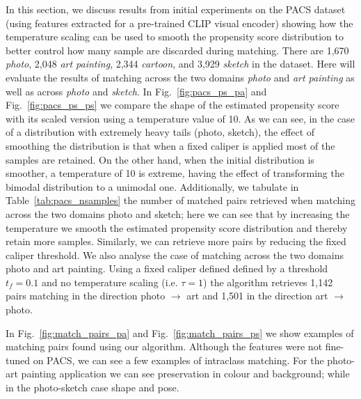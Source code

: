 In this section, we discuss results from initial experiments on the PACS
dataset~\citep{li2017deeper} (using features extracted for a pre-trained CLIP
\citep{radford2021learning} visual encoder) showing how the temperature scaling can be used to
smooth the propensity score distribution to better control how many sample are discarded during
matching. 
% 
There are 1,670 \emph{photo}, 2,048 \emph{art painting}, 2,344 \emph{cartoon}, and 3,929
\emph{sketch} in the dataset. Here will evaluate the results of matching across the two domains
\emph{photo} and \emph{art painting} as well as across \emph{photo} and \emph{sketch}.
% 
In Fig.~\ref{fig:pacs_ps_pa} and Fig.~\ref{fig:pacs_ps_ps} we compare the shape of the estimated
propensity score with its scaled version using a temperature value of 10. 
%
As we can see, in the case of a distribution with extremely heavy tails (photo, sketch), the effect
of smoothing the distribution is that when a fixed caliper is applied most of the samples are
retained. 
%
On the other hand, when the initial distribution is smoother, a temperature of 10 is extreme,
having the effect of transforming the bimodal distribution to a unimodal one.
% 
Additionally, we tabulate in Table~\ref{tab:pacs_nsamples} the number of matched pairs retrieved
when matching across the two domains photo and sketch; here we can see that by increasing the
temperature we smooth the estimated propensity score distribution and thereby retain more samples.
%
Similarly, we can retrieve more pairs by reducing the fixed caliper threshold. 
%
We also analyse the case of matching across the two domains photo and art painting. Using a fixed
caliper defined defined by a threshold \( t_f = 0.1 \) and no temperature scaling (i.e. $\tau=1$) the
algorithm retrieves 1,142 pairs matching in the direction photo $\rightarrow$ art and 1,501 in the
direction art $\rightarrow$ photo. 
% 

In Fig.~\ref{fig:match_pairs_pa} and Fig.~\ref{fig:match_pairs_ps} we show examples of matching
pairs found using our \CNN{} algorithm. Although the features were not fine-tuned on PACS, we can
see a few examples of intraclass matching. For the photo-art painting application we can see
preservation in colour and background; while in the photo-sketch case shape and pose.

